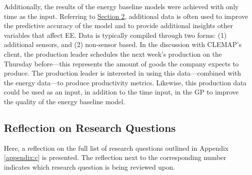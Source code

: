 Additionally, the results of the energy baseline models were achieved with only time as the input. Referring to \hyperlink{section.2}{Section 2}, additional data is often used to improve the predictive accuracy of the model and to provide additional insights other variables that affect EE. Data is typically compiled through two forms: (1) additional sensors, and (2) non-sensor based. In the discussion with CLEMAP's client, the production leader schedules the next week's production on the Thursday before—this represents the amount of goods the company expects to produce. The production leader is interested in using this data—combined with the energy data—to produce productivity metrics. Likewise, this production data could be used as an input, in addition to the time input, in the GP to improve the quality of the energy baseline model.

\subsection{Reflection on Research Questions}

Here, a reflection on the full list of research questions outlined in Appendix \ref{appendix:c} is presented. The reflection next to the corresponding number indicates which research question is being reviewed upon.

